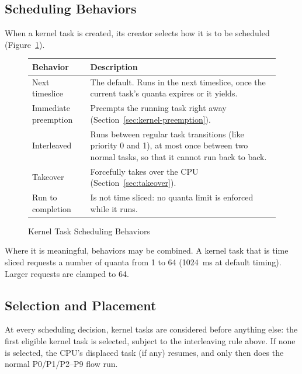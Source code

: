 \documentclass[11pt]{article}
\begin{document}
\subsection{Scheduling Behaviors}

When a kernel task is created, its creator selects how it is to be scheduled (Figure~\ref{fig:kernel-behaviors}).

\begin{figure}[H]
	\centering
	\begin{tabularx}{\linewidth}{@{}lX@{}}
		\toprule
		\textbf{Behavior}    & \textbf{Description}                                                                                                                      \\
		\midrule
		Next timeslice       & The default. Runs in the next timeslice, once the current task's quanta expires or it yields.                                             \\
		Immediate preemption & Preempts the running task right away (Section~\ref{sec:kernel-preemption}).                                                               \\
		Interleaved          & Runs between regular task transitions (like priority 0 and 1), at most once between two normal tasks, so that it cannot run back to back. \\
		Takeover             & Forcefully takes over the CPU (Section~\ref{sec:takeover}).                                                                               \\
		Run to completion    & Is not time sliced: no quanta limit is enforced while it runs.                                                                            \\
		\bottomrule
	\end{tabularx}
	\caption{Kernel Task Scheduling Behaviors}
	\label{fig:kernel-behaviors}
\end{figure}

Where it is meaningful, behaviors may be combined.
A kernel task that is time sliced requests a number of quanta from 1 to 64 (1024~ms at default timing). Larger requests are clamped to 64.

\subsection{Selection and Placement}

At every scheduling decision, kernel tasks are considered before anything else: the first eligible kernel task is selected, subject to the interleaving rule above.
If none is selected, the CPU's displaced task (if any) resumes, and only then does the normal P0/P1/P2--P9 flow run.
\end{document}
